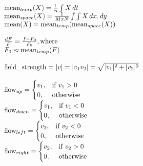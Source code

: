 \begin{equation}
  \begin{array}{l}
  \text{mean}_{temp}(X) = \frac{1}{n} \int X \,dt\\
  \text{mean}_{space}(X) = \frac{1}{MxN} \int \int X \,dx, dy\\
  \text{mean}(X) = \text{mean}_{temp}(\text{mean}_{space}(X))
  \\
  \\
  \frac{dF}{F} = \frac{f - F_0}{F_0}, \text{where}\\
  F_0 \approx \text{mean}_{temp}(F)\\

  \\

  \text{field\_strength}=|v|=|v_1 v_2 |=\sqrt{|v_1 |^2+|v_2 |^2}\\
  \\

  \text{flow}_{up}=
  \begin{cases}
      v_1,& \text{if } v_1 > 0\\
      0,              & \text{otherwise}
  \end{cases}\\

  \text{flow}_{down}=
  \begin{cases}
      v_1,& \text{if } v_1 < 0\\
      0,              & \text{otherwise}
  \end{cases}\\

  \text{flow}_{left}=
  \begin{cases}
      v_2,& \text{if } v_2 < 0\\
      0,              & \text{otherwise}
  \end{cases}\\

  \text{flow}_{right}=
  \begin{cases}
      v_2,& \text{if } v_2 > 0\\
      0,              & \text{otherwise}
  \end{cases}\\

  \end{array}\\
  \label{eqn:features}
\end{equation}
